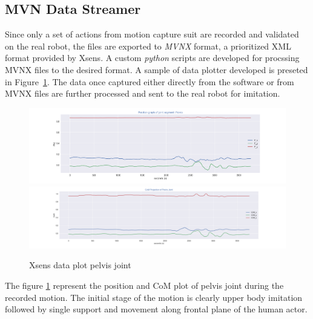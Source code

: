 \subsection{MVN Data Streamer}

Since only a set of actions from motion capture suit are recorded and validated on the real robot, the files are exported to \textit{MVNX} format, a prioritized XML format provided by Xsens. A custom \textit{python} scripts are developed 
for procssing MVNX files to the desired format. A sample of data plotter developed is preseted in Figure~\ref{fig: xsens-plot}. The data once captured either
directly from the software or from MVNX files are further processed and sent to the real robot for imitation.  


\begin{figure}[h!]
    \centering
    \includegraphics[scale=0.435]{images/xsens-pelvis-position.png}\hfill
    \includegraphics[scale=0.35]{images/xsens-pelvis-com.png}\hfill
    \caption{Xsens data plot pelvis joint}\hfill
    \label{fig: xsens-plot}
\end{figure}

The figure \ref{fig: xsens-plot} represent the position and CoM plot of pelvis joint during the recorded motion. 
The initial stage of the motion is clearly upper body imitation followed by single support and movement along frontal plane of the human actor.